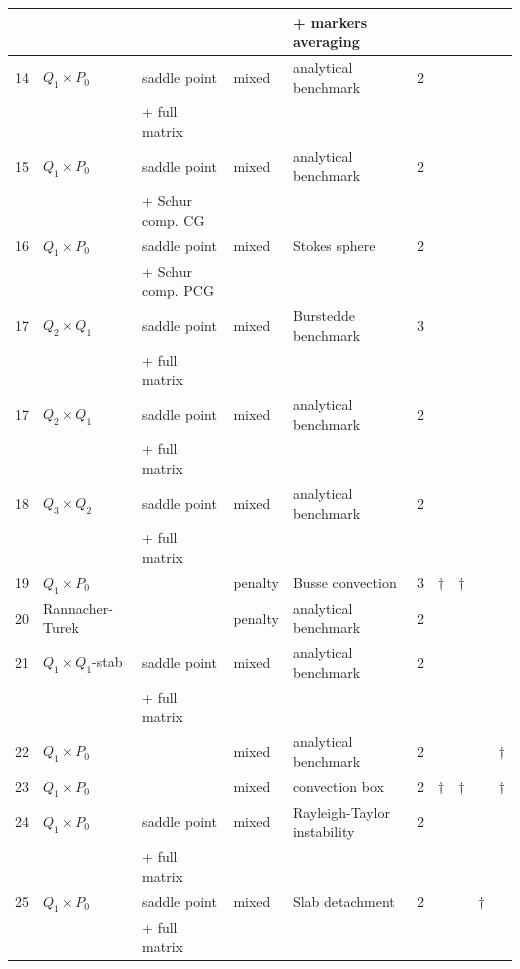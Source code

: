 \documentclass[a4paper]{article}
\begin{document}
{\begin{tabular}{|p{0.4cm}||p{1.3cm}p{2cm}p{1.7cm}p{4.4cm}p{0.4cm}p{0.4cm}p{0.4cm}p{0.4cm}p{0.4cm}|}
   &                  &              &         & + markers averaging         &   &       &        & &\\
\hline
14 & $Q_1 \times P_0$ & saddle point & mixed   & analytical benchmark        & 2 &       &        & &\\ 
   &                  & + full matrix& &&&&&&\\
\hline
15 & $Q_1 \times P_0$ & saddle point & mixed   & analytical benchmark        & 2 &       &        & &\\ 
   &                  & + Schur comp. CG & &&&&&&\\
\hline
16 & $Q_1 \times P_0$ & saddle point & mixed   & Stokes sphere               & 2 &       &        & &\\ 
   &                  & + Schur comp. PCG & &&&&&&\\
\hline
17 & $Q_2 \times Q_1$ & saddle point & mixed   & Burstedde benchmark         & 3 &       &        & &\\ 
   &                  & + full matrix& &&&&&&\\    
\hline
17 & $Q_2 \times Q_1$ & saddle point & mixed   & analytical benchmark        & 2 &       &        & &\\ 
   &                  & + full matrix& &&&&&&\\    
\hline
18 & $Q_3 \times Q_2$ & saddle point & mixed   & analytical benchmark        & 2 &       &        & &\\ 
   &                  & + full matrix& &&&&&&\\    
\hline
19 & $Q_1 \times P_0$ &              & penalty & Busse convection            & 3 & $\dag$& $\dag$ & &\\ 
\hline
20 & Rannacher-Turek  &              & penalty & analytical benchmark        & 2 &       &        & &\\ 
\hline
21 & $Q_1 \times Q_1$-stab & saddle point  & mixed & analytical benchmark    & 2 &       &        & &\\ 
   &                  & + full matrix& &&&&&&\\    
\hline
22 & $Q_1 \times P_0$ &              & mixed  & analytical benchmark         & 2 &       &        & & $\dag$ \\ 
\hline
23 & $Q_1 \times P_0$ &              & mixed  & convection box               & 2 & $\dag$& $\dag$ & & $\dag$ \\
\hline
24 & $Q_1 \times P_0$ & saddle point & mixed  & Rayleigh-Taylor instability  & 2 &       &        & & \\ 
   &                  & + full matrix& &&&&&&\\    
\hline
25 & $Q_1 \times P_0$ & saddle point & mixed  & Slab detachment              & 2 &       &        & $\dag$ & \\ 
   &                  & + full matrix& &&&&&&\\
\hline
\hline
\end{tabular}
}
\end{document}
